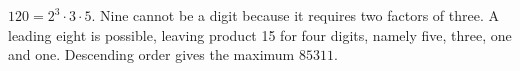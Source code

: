 $120=2^3\cdot3\cdot5$. Nine cannot be a digit because it requires two factors of three. A leading eight is possible, leaving product 15 for four digits, namely five, three, one and one. Descending order gives the maximum $\boxed{85311}$.
